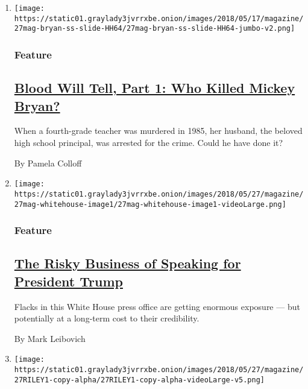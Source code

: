 \begin{enumerate}
\def\labelenumi{\arabic{enumi}.}
\item
  \texttt{[image: https://static01.graylady3jvrrxbe.onion/images/2018/05/17/magazine/27mag-bryan-ss-slide-HH64/27mag-bryan-ss-slide-HH64-jumbo-v2.png]}

  \hypertarget{feature}{%
  \subsubsection{Feature}\label{feature}}

  \hypertarget{blood-will-tell-part-1-who-killed-mickey-bryan}{%
  \subsection{\texorpdfstring{\href{/interactive/2018/05/23/magazine/joe-bryan-blood-forensics-murder.html}{Blood
  Will Tell, Part 1: Who Killed Mickey
  Bryan?}}{Blood Will Tell, Part 1: Who Killed Mickey Bryan?}}\label{blood-will-tell-part-1-who-killed-mickey-bryan}}

  When a fourth-grade teacher was murdered in 1985, her husband, the
  beloved high school principal, was arrested for the crime. Could he
  have done it?

  By Pamela Colloff
\item
  \texttt{[image: https://static01.graylady3jvrrxbe.onion/images/2018/05/27/magazine/27mag-whitehouse-image1/27mag-whitehouse-image1-videoLarge.png]}

  \hypertarget{feature-1}{%
  \subsubsection{Feature}\label{feature-1}}

  \hypertarget{the-risky-business-of-speaking-for-president-trump}{%
  \subsection{\texorpdfstring{\href{/2018/05/23/magazine/the-risky-business-of-speaking-for-president-trump.html}{The
  Risky Business of Speaking for President
  Trump}}{The Risky Business of Speaking for President Trump}}\label{the-risky-business-of-speaking-for-president-trump}}

  Flacks in this White House press office are getting enormous exposure
  --- but potentially at a long-term cost to their credibility.

  By Mark Leibovich
\item
  \texttt{[image: https://static01.graylady3jvrrxbe.onion/images/2018/05/27/magazine/27RILEY1-copy-alpha/27RILEY1-copy-alpha-videoLarge-v5.png]}


\end{enumerate}
